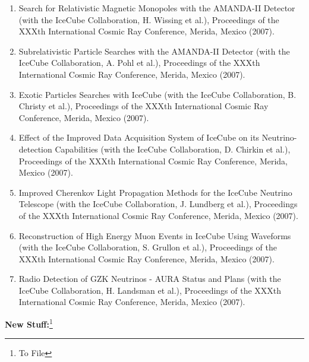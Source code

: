 \begin{enumerate}
\item Search for Relativistic Magnetic Monopoles with the AMANDA-II Detector (with the IceCube Collaboration, H. Wissing et al.), Proceedings of the XXXth International Cosmic Ray Conference, Merida, Mexico (2007).

\item Subrelativistic Particle Searches with the AMANDA-II Detector (with the IceCube Collaboration, A. Pohl et al.), Proceedings of the XXXth International Cosmic Ray Conference, Merida, Mexico (2007).

\item Exotic Particles Searches with IceCube (with the IceCube Collaboration, B. Christy et al.), Proceedings of the XXXth International Cosmic Ray Conference, Merida, Mexico (2007).

\item Effect of the Improved Data Acquisition System of IceCube on its Neutrino-detection Capabilities (with the IceCube Collaboration, D. Chirkin et al.), Proceedings of the XXXth International Cosmic Ray Conference, Merida, Mexico (2007).

\item Improved Cherenkov Light Propagation Methods for the IceCube Neutrino Telescope (with the IceCube Collaboration, J. Lundberg et al.), Proceedings of the XXXth International Cosmic Ray Conference, Merida, Mexico (2007).

\item Reconstruction of High Energy Muon Events in IceCube Using Waveforms (with the IceCube Collaboration, S. Grullon et al.), Proceedings of the XXXth International Cosmic Ray Conference, Merida, Mexico (2007).

\item Radio Detection of GZK Neutrinos - AURA Status and Plans (with the IceCube Collaboration, H. Landsman et al.), Proceedings of the XXXth International Cosmic Ray Conference, Merida, Mexico (2007).


\end{enumerate}

{\bf New Stuff:}\footnote{To File}
\vspace{0.25cm}

